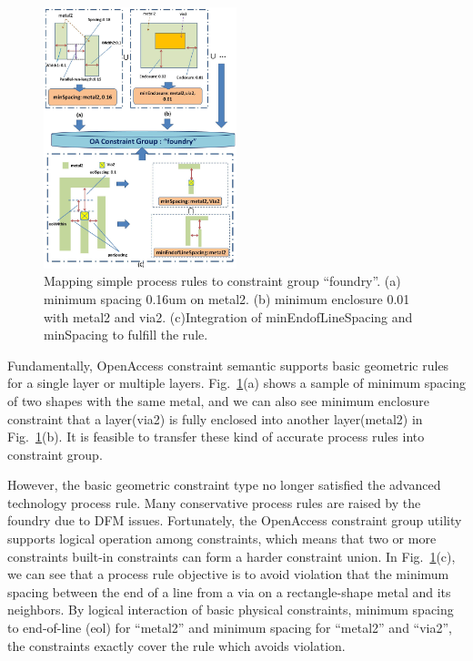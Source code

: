     
      \begin{figure}[t]
        \centering
        \includegraphics[width=0.5\textwidth]{Fig/Chapter3/SimpleRuleCon2.eps}
        \caption{Mapping simple process rules to constraint group ``foundry''. (a) minimum spacing 0.16um on metal2. (b) minimum enclosure 0.01 with metal2 and via2. (c)Integration of minEndofLineSpacing and minSpacing to fulfill the rule.}
        \label{fig:SimruleCon}
      \end{figure}
    
      Fundamentally, OpenAccess constraint semantic supports basic geometric rules for a single layer or multiple layers. Fig.~\ref{fig:SimruleCon}(a) shows a sample of minimum spacing of two shapes with the same metal, and we can also see minimum enclosure constraint that a layer(via2) is fully enclosed into another layer(metal2) in Fig.~\ref{fig:SimruleCon}(b). It is feasible to transfer these kind of accurate process rules into constraint group.

      However, the basic geometric constraint type no longer satisfied the advanced technology process rule. Many conservative process rules are raised by the foundry due to DFM issues. Fortunately, the OpenAccess constraint group utility supports logical operation among constraints, which means that two or more constraints built-in constraints can form a harder constraint union. In Fig.~\ref{fig:SimruleCon}(c), we can see that a process rule objective is to avoid violation that the minimum spacing between the end of a line from a via on a rectangle-shape metal and its neighbors. By logical interaction of basic physical constraints, minimum spacing to end-of-line (eol) for ``metal2'' and minimum spacing for ``metal2'' and ``via2'', the constraints exactly cover the rule which avoids violation.
      

